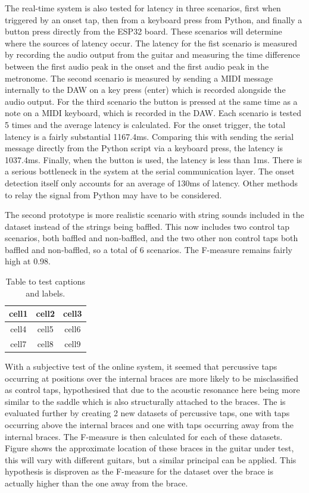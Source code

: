 \documentclass[conference]{IEEEtran}
\begin{document}
The real-time system is also tested for latency in three scenarios, first when triggered by an onset tap, then from a keyboard press from Python, and finally a button press directly from the
ESP32 board. These scenarios will determine where the sources of latency occur. The latency for the fist scenario is measured by recording the audio output from the guitar and measuring the time difference between the first audio peak in the onset and the first audio peak in the metronome.
The second scenario is measured by sending a MIDI message internally to the DAW on a key press (enter) which is recorded alongside the audio output. For the third scenario the button is pressed at the same time as a note on a MIDI keyboard, which is recorded in the DAW. 
Each scenario is tested 5 times and the average latency is calculated. For the onset trigger, the total latency is a fairly substantial 1167.4ms. Comparing this with sending
the serial message directly from the Python script via a keyboard press, the latency is 1037.4ms. Finally, when the button is used, the latency is less than 1ms.
There is a serious bottleneck in the system at the serial communication layer. The onset detection itself only accounts for an average of 130ms of latency. Other methods to relay the signal
from Python may have to be considered.

The second prototype is more realistic scenario with string sounds included in the dataset instead of the strings being baffled. This now includes two control tap scenarios, both baffled and non-baffled, and the two other non control taps both baffled and non-baffled,
so a total of 6 scenarios. The F-measure remains fairly high at 0.98.

    \begin{table}[!t]
    \caption{Table to test captions and labels.}
    \centering
    \begin{tabular}{ |c|c|c| } 
     \hline
     cell1 & cell2 & cell3 \\ 
     \hline
     cell4 & cell5 & cell6 \\ 
     cell7 & cell8 & cell9 \\ 
     \hline
    \end{tabular}
    
\end{table}


With a subjective test of the online system, it seemed that percussive taps occurring at positions over the internal braces are more likely to be misclassified as control taps, hypothesised that due to the acoustic resonance here being more similar to the saddle which is also structurally attached to
the braces. The is evaluated further by creating 2 new datasets of percussive taps, one with taps occurring above the internal braces and one with taps occurring away from the internal braces. The F-measure is then calculated for each of these datasets.
Figure shows the approximate location of these braces in the guitar under test, this will vary with different guitars, but a similar principal can be applied. This hypothesis is disproven as the F-measure for the dataset over the brace is actually higher than the 
one away from the brace.
\end{document}
